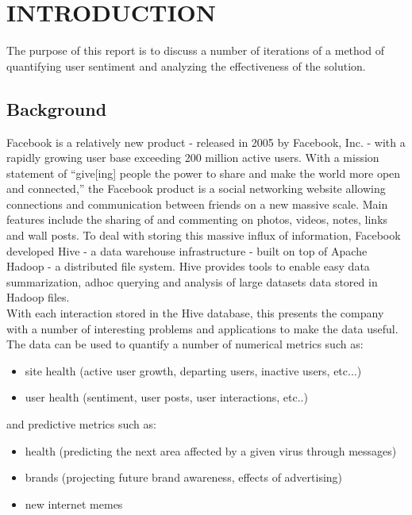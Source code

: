 \section{INTRODUCTION} %
\label{sec:introduction}
	The purpose of this report is to discuss a number of iterations of a method of quantifying user sentiment and analyzing the effectiveness of the solution.
	
	\subsection{Background} %
	\label{sub:background}
Facebook is a relatively new product - released in 2005 by Facebook, Inc. - 
with a rapidly growing user base exceeding 200 million active users.  With a mission statement of ``give[ing] people the power to share and make the world more open and connected,'' \cite{facebook_mission} the Facebook product is a social networking website allowing connections and communication between friends on a new massive scale.  Main features include the sharing of and commenting on photos, videos, notes, links and wall posts. To deal with storing this massive influx of information, Facebook developed Hive - a data warehouse infrastructure - built on top of Apache Hadoop - a distributed file system. Hive provides tools to enable easy data summarization, adhoc querying and analysis of large datasets data stored in Hadoop files. \cite{hive_about}\\

With each interaction stored in the Hive database, this presents the company with a number of interesting problems and applications to make the data useful.  The data can be used to quantify a number of numerical metrics such as:
\begin{itemize}
	\item site health (active user growth, departing users, inactive users, etc...)
	\item user health (sentiment, user posts, user interactions, etc..)
\end{itemize}

and predictive metrics such as:
\begin{itemize}
	\item health (predicting the next area affected by a given virus through messages)
	\item brands (projecting future brand awareness, effects of advertising)
	\item new internet memes
\end{itemize}

